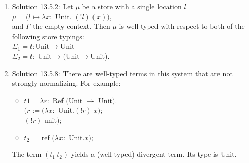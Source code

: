 \documentclass [proof]{article}
\begin{document}
\begin{enumerate}
	\item Solution 13.5.2: Let $\mu$ be a store with a single location  $l$\\
	 $\mu = (l \mapsto \lambda x:$ \textsf Unit. $(!l)(x))$,\\
     and $\Gamma$ the empty context. Then $\mu$ is well typed with respect to both of the following store typings:\\
     $\Sigma_1 = l:$Unit$\to$Unit\\
     $\Sigma_2 = l:$ Unit$\to($Unit$\to$Unit)$.$\\
	\item Solution 13.5.8: There are well-typed terms in this system that are not strongly normalizing. For example:
	\begin{itemize}
	\item $t1 = \lambda r:$ \textsf Ref $($Unit $\to$ Unit$)$.\\
	$(r := (\lambda x:$ Unit.$(!r) \ x);$\\
	$(!r)$ \textsf unit$);$
	\item $t_2 =$ \textsf ref $(\lambda x:$ Unit$. x);$
	\end{itemize}
	The term $(t_1 \ t_2)$ yields a (well-typed) divergent term. Its type is Unit.	
\end{enumerate}
\end{document}
